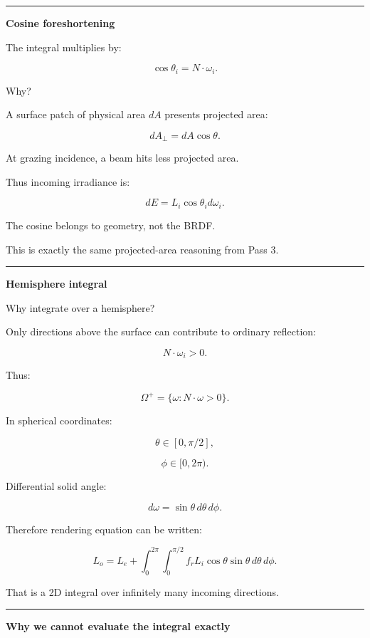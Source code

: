 \begin{center}\rule{0.5\linewidth}{0.5pt}\end{center}

\textbf{Cosine foreshortening}

The integral multiplies by:

\[
\boxed{
\cos\theta_i
=
N\cdot\omega_i.
}
\]

Why?

A surface patch of physical area \(dA\) presents projected area:

\[
dA_\perp
=
dA\cos\theta.
\]

At grazing incidence, a beam hits less projected area.

Thus incoming irradiance is:

\[
dE
=
L_i
\cos\theta_i
d\omega_i.
\]

The cosine belongs to geometry, not the BRDF.

This is exactly the same projected-area reasoning from Pass 3.

\begin{center}\rule{0.5\linewidth}{0.5pt}\end{center}

\textbf{Hemisphere integral}

Why integrate over a hemisphere?

Only directions above the surface can contribute to ordinary reflection:

\[
N\cdot\omega_i>0.
\]

Thus:

\[
\Omega^+
=
\{
\omega:
N\cdot\omega>0
\}.
\]

In spherical coordinates:

\[
\theta\in[0,\pi/2],
\]

\[
\phi\in[0,2\pi).
\]

Differential solid angle:

\[
\boxed{
d\omega
=
\sin\theta\,d\theta\,d\phi.
}
\]

Therefore rendering equation can be written:

\[
L_o
=
L_e
+
\int_0^{2\pi}
\int_0^{\pi/2}
f_r
L_i
\cos\theta
\sin\theta
\,d\theta\,d\phi.
\]

That is a 2D integral over infinitely many incoming directions.

\begin{center}\rule{0.5\linewidth}{0.5pt}\end{center}

\textbf{Why we cannot evaluate the integral exactly}

